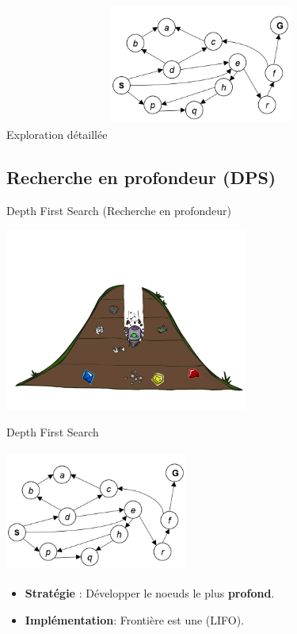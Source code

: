 \documentclass{beamer}
\begin{document}
\begin{frame}[t]{Exploration détaillée}
 \centering 
 \includegraphics[width=6cm,height=5cm]{./images/tiny_graphe.png}
\end{frame}
\subsection{Recherche en profondeur (DPS)}%
\label{sub:recherche_en_profondeur_dps_}
\begin{frame}[t]{Depth First Search (Recherche en profondeur)}
 
  \centering
  \includegraphics[width=8cm,height=6cm]{./images/depth_first_search.png}
\end{frame}

\begin{frame}[t]{Depth First Search}

  \centering
  \includegraphics[width=6cm,height = 4cm]{./images/tiny_graphe.png}
  \vspace*{1cm}
  \begin{itemize}
    \item \textbf{Stratégie} : Développer le noeuds le plus
      \alert{\textbf{profond}}. 
    \item \textbf{Implémentation}: Frontière est une
      \textbf{}(LIFO). 
  \end{itemize}
\end{frame}
\end{document}
